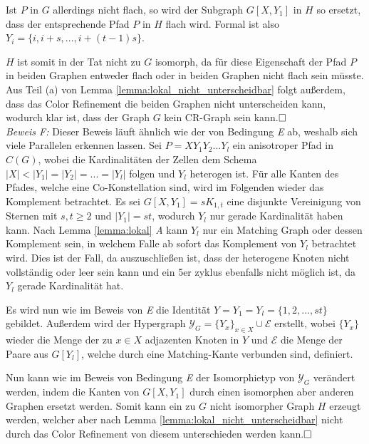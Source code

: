 Ist $P$ in $G$ allerdings nicht flach, so wird der Subgraph $G[X,Y_1]$ in $H$ so ersetzt, dass der entsprechende Pfad $P$ in $H$ flach wird.
Formal ist also $Y_i=\{i,i+s,...,i+(t-1)s\}$.

$H$ ist somit in der Tat nicht zu $G$ isomorph, da für diese Eigenschaft der Pfad $P$ in beiden Graphen entweder flach oder in beiden Graphen nicht flach sein müsste.
Aus Teil (a) von Lemma \ref{lemma:lokal_nicht_unterscheidbar} folgt außerdem, dass das Color Refinement die beiden Graphen nicht unterscheiden kann, wodurch klar ist, dass der Graph $G$ kein CR-Graph sein kann.$\hfill\square$\\

\emph{Beweis F:} Dieser Beweis läuft ähnlich wie der von Bedingung \emph{E} ab, weshalb sich viele Parallelen erkennen lassen.
Sei $P=XY_1Y_2...Y_l$ ein anisotroper Pfad in $C(G)$, wobei die Kardinalitäten der Zellen dem Schema $|X|<|Y_1|=|Y_2|=...=|Y_l|$ folgen und $Y_l$ heterogen ist.
Für alle Kanten des Pfades, welche eine Co-Konstellation sind, wird im Folgenden wieder das Komplement betrachtet.
Es sei $G[X,Y_1]=sK_{1,t}$ eine disjunkte Vereinigung von Sternen mit $s,t\geq 2$ und $|Y_1|=st$, wodurch $Y_l$ nur gerade Kardinalität haben kann.
Nach Lemma \ref{lemma:lokal} \emph{A} kann $Y_l$ nur ein Matching Graph oder dessen Komplement sein, in welchem Falle ab sofort das Komplement von $Y_l$ betrachtet wird.
Dies ist der Fall, da auszuschließen ist, dass der heterogene Knoten nicht vollständig oder leer sein kann und ein 5er \gls{zyklus} ebenfalls nicht möglich ist, da $Y_l$ gerade Kardinalität hat.

Es wird nun wie im Beweis von \emph{E} die Identität $Y=Y_1=Y_l=\{1,2,...,st\}$ gebildet.
Außerdem wird der Hypergraph $\mathcal{Y}_G=\{Y_x\}_{x\in X}\cup \mathcal{E}$ erstellt, wobei $\{Y_x\}$ wieder die Menge der zu $x\in X$ adjazenten Knoten in $Y$ und $\mathcal{E}$ die Menge der Paare aus $G[Y_l]$, welche durch eine Matching-Kante verbunden sind, definiert.

Nun kann wie im Beweis von Bedingung \emph{E} der Isomorphietyp von $\mathcal{Y}_G$ verändert werden, indem die Kanten von $G[X,Y_1]$ durch einen isomorphen aber anderen Graphen ersetzt werden.
Somit kann ein zu $G$ nicht isomorpher Graph $H$ erzeugt werden, welcher aber nach Lemma \ref{lemma:lokal_nicht_unterscheidbar} nicht durch das Color Refinement von diesem unterschieden werden kann.$\hfill\square$

